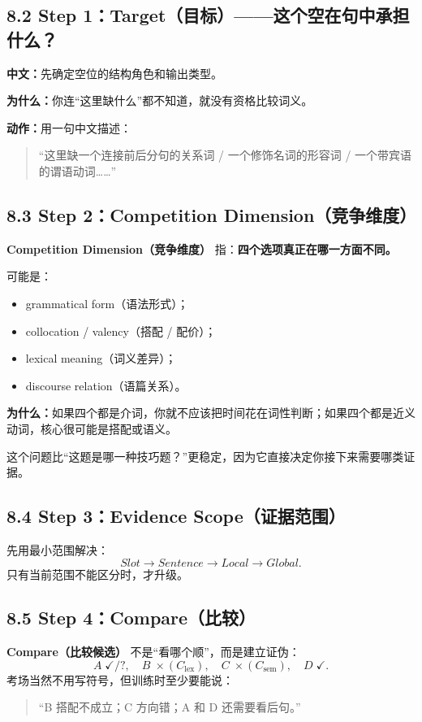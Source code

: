 \documentclass[11pt,a4paper]{ctexart}
\newcommand{\kw}[1]{\textbf{#1}}
\newcommand{\term}[2]{\textbf{#1（#2）}}
\begin{document}
\subsection{8.2 Step 1：Target（目标）——这个空在句中承担什么？}
\kw{中文：}先确定空位的结构角色和输出类型。

\kw{为什么：}你连“这里缺什么”都不知道，就没有资格比较词义。

\kw{动作：}用一句中文描述：
\begin{quote}
“这里缺一个连接前后分句的关系词 / 一个修饰名词的形容词 / 一个带宾语的谓语动词……”
\end{quote}

\subsection{8.3 Step 2：Competition Dimension（竞争维度）}
\term{Competition Dimension}{竞争维度} 指：\kw{四个选项真正在哪一方面不同。}

可能是：
\begin{itemize}
  \item grammatical form（语法形式）；
  \item collocation / valency（搭配 / 配价）；
  \item lexical meaning（词义差异）；
  \item discourse relation（语篇关系）。
\end{itemize}

\kw{为什么：}如果四个都是介词，你就不应该把时间花在词性判断；如果四个都是近义动词，核心很可能是搭配或语义。

\begin{exam}[最重要的起手句]

这个问题比“这题是哪一种技巧题？”更稳定，因为它直接决定你接下来需要哪类证据。
\end{exam}

\subsection{8.4 Step 3：Evidence Scope（证据范围）}
先用最小范围解决：
\[
Slot\rightarrow Sentence\rightarrow Local\rightarrow Global.
\]
只有当前范围不能区分时，才升级。

\subsection{8.5 Step 4：Compare（比较）}
\term{Compare}{比较候选} 不是“看哪个顺”，而是建立证伪：
\[
A\;\checkmark/? ,\quad
B\;\times(C_{\text{lex}}),\quad
C\;\times(C_{\text{sem}}),\quad
D\;\checkmark.
\]
考场当然不用写符号，但训练时至少要能说：
\begin{quote}
“B 搭配不成立；C 方向错；A 和 D 还需要看后句。”
\end{quote}
\end{document}
